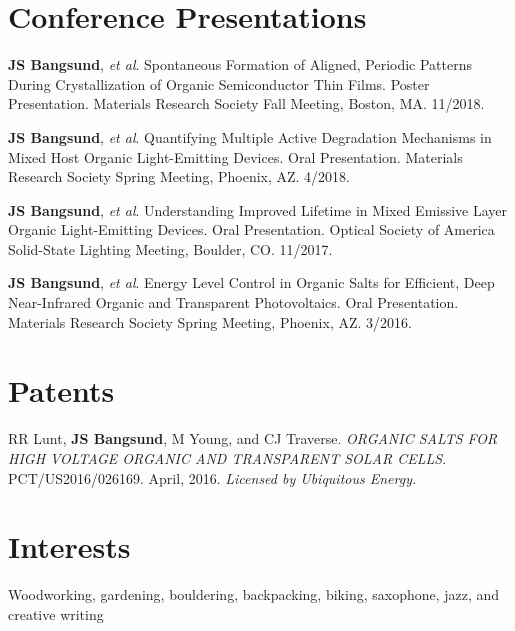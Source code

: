 \documentclass{article}
\newcommand{\headspace}{\vspace{0.8em}} %
\renewenvironment{itemize}[1]{\begin{compactitem}#1}{\end{compactitem}}
\begin{document}
\section{Conference Presentations}
\headspace
\begin{itemize}[1]
\item[4] \textbf{JS Bangsund}, {\em et al}. Spontaneous Formation of Aligned, Periodic Patterns During Crystallization of Organic Semiconductor Thin Films. Poster Presentation. Materials Research Society Fall Meeting, Boston, MA. 11/2018.
\item[3] \textbf{JS Bangsund}, {\em et al}. Quantifying Multiple Active Degradation Mechanisms in Mixed Host Organic Light-Emitting Devices. Oral Presentation. Materials Research Society Spring Meeting, Phoenix, AZ. 4/2018.
\item[2] \textbf{JS Bangsund}, {\em et al}. Understanding Improved Lifetime in Mixed Emissive Layer Organic Light-Emitting Devices. Oral Presentation. Optical Society of America Solid-State Lighting Meeting, Boulder, CO. 11/2017.
\item[1] \textbf{JS Bangsund}, {\em et al}. Energy Level Control in Organic Salts for Efficient, Deep Near-Infrared Organic and Transparent Photovoltaics. Oral Presentation. Materials Research Society Spring Meeting, Phoenix, AZ. 3/2016.
\end{itemize}

\section{Patents}
\headspace
\begin{itemize}[\tiny{$\blacksquare$}]
\item RR Lunt, \textbf{JS Bangsund}, M Young, and CJ Traverse. {\em ORGANIC SALTS FOR HIGH VOLTAGE ORGANIC AND TRANSPARENT SOLAR CELLS}. PCT/US2016/026169. April, 2016. {\em Licensed by Ubiquitous Energy.}
\end{itemize}

\section{Interests}
\headspace
Woodworking, gardening, bouldering, backpacking, biking, saxophone, jazz, and creative writing
\end{document}
